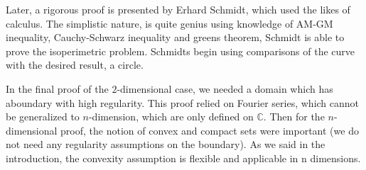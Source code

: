 \documentclass[a4paper]{book}
\numberwithin{theorem}{section}%
\begin{document}
Later, a rigorous proof is presented by Erhard Schmidt, which used the likes of calculus. The simplistic nature, is quite genius using knowledge of AM-GM inequality, Cauchy-Schwarz inequality and greens theorem, Schmidt is able to prove the isoperimetric problem. Schmidts begin using comparisons of the curve with the desired result, a circle.

In the final proof of the $2$-dimensional case, we needed a domain which has aboundary with high regularity. This proof relied on Fourier series, which cannot be generalized to $n$-dimension, which are only defined on $\mathbb{C}$. Then for the $n$-dimensional proof, the notion of convex and compact sets were important (we do not need any regularity assumptions on the boundary). As we said in the introduction, the convexity assumption is flexible and applicable in n dimensions.


\end{document}
